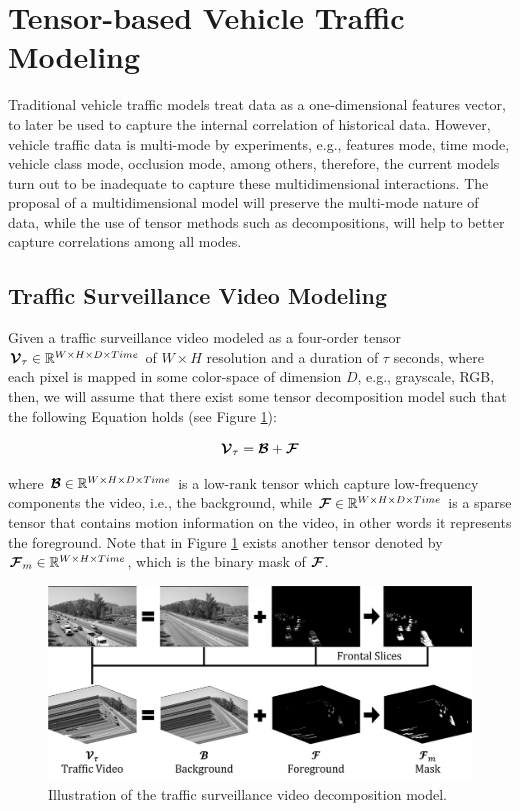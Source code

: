 \documentclass[sensors,article,submit,moreauthors,pdftex]{Definitions/mdpi}
\newcommand{\mathten}[1]{\boldsymbol{\mathbf{\mathcal{\MakeUppercase{#1}}}}}
\begin{document}
\section{Tensor-based Vehicle Traffic Modeling}
Traditional vehicle traffic models treat data as a one-dimensional features vector, to later be used to capture the internal correlation of historical data. However, vehicle traffic data is multi-mode by experiments, e.g., features mode, time mode, vehicle class mode, occlusion mode, among others, therefore, the current models turn out to be inadequate to capture these multidimensional interactions. The proposal of a multidimensional model will preserve the multi-mode nature of data, while the use of tensor methods such as decompositions, will help to better capture correlations among all modes.

\subsection{Traffic Surveillance Video Modeling}

Given a traffic surveillance video modeled as a four-order tensor $\mathten{V}_\tau \in \mathbb{R}^{W\times H \times D \times Time}$ of $W \times H$ resolution and a duration of $\tau$ seconds, where each pixel is mapped in some color-space of dimension $D$, e.g., grayscale, RGB, then, we will assume that there exist some tensor decomposition model such that the following Equation holds (see Figure \ref{fig:tsvmodel}):

\begin{equation}
\mathten{V}_\tau = \mathten{B} + \mathten{F}
\label{eq:tsvmodel}
\end{equation}

where $\mathten{B} \in \mathbb{R}^{W\times H \times D \times Time}$ is a low-rank tensor which capture low-frequency components the video, i.e., the background, while $\mathten{F} \in \mathbb{R}^{W\times H \times D \times Time}$ is a sparse tensor that contains motion information on the video, in other words it represents the foreground. Note that in Figure \ref{fig:tsvmodel} exists another tensor denoted by $\mathten{F}_m \in \mathbb{R}^{W\times H \times Time}$, which is the binary mask of $\mathten{F}$.

\begin{figure}[H]
\centering
\includegraphics[width=14 cm]{images/traffic-model.png}
\caption{Illustration of the traffic surveillance video decomposition model.}
\label{fig:tsvmodel}
\end{figure}
\end{document}
